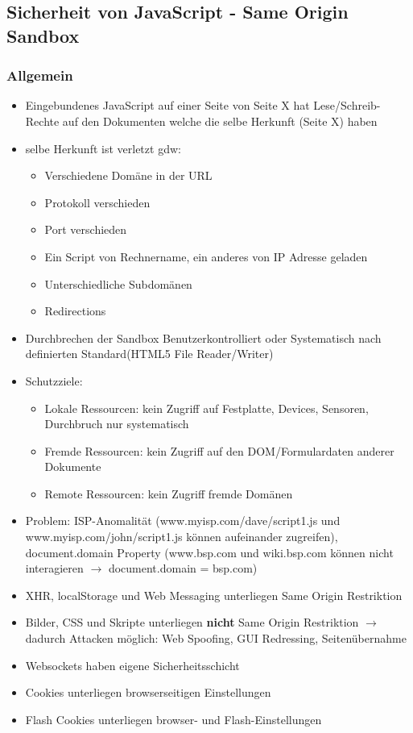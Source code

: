 \documentclass{article} %
\begin{document}
	
	\subsection{Sicherheit von JavaScript - Same Origin Sandbox}
	\subsubsection{Allgemein}
	\begin{itemize}
		\item Eingebundenes JavaScript auf einer Seite von Seite X hat Lese/Schreib-Rechte auf den Dokumenten welche die selbe Herkunft (Seite X) haben
		\item selbe Herkunft ist verletzt gdw:
		\begin{itemize}
			\item Verschiedene Domäne in der URL
			\item Protokoll verschieden
			\item Port verschieden
			\item Ein Script von Rechnername, ein anderes von IP Adresse geladen
			\item Unterschiedliche Subdomänen
			\item Redirections
		\end{itemize}
		\item Durchbrechen der Sandbox Benutzerkontrolliert oder Systematisch nach definierten Standard(HTML5 File Reader/Writer)
		\item Schutzziele:
		\begin{itemize}
			\item Lokale Ressourcen: kein Zugriff auf Festplatte, Devices, Sensoren, Durchbruch nur systematisch
			\item Fremde Ressourcen: kein Zugriff auf den DOM/Formulardaten anderer Dokumente
			\item Remote Ressourcen: kein Zugriff fremde Domänen
		\end{itemize}
		\item Problem: ISP-Anomalität (www.myisp.com/dave/script1.js und www.myisp.com/john/script1.js können aufeinander zugreifen), document.domain Property (www.bsp.com und wiki.bsp.com können nicht interagieren $\rightarrow$ document.domain = \glqq bsp.com\grqq)
		\item XHR, localStorage und Web Messaging unterliegen Same Origin Restriktion
		\item Bilder, CSS und Skripte unterliegen \textbf{nicht} Same Origin Restriktion $\rightarrow$ dadurch Attacken möglich: Web Spoofing, GUI Redressing, Seitenübernahme
		\item Websockets haben eigene Sicherheitsschicht
		\item Cookies unterliegen browserseitigen Einstellungen
		\item Flash Cookies unterliegen browser- und Flash-Einstellungen
	\end{itemize}
\end{document}
